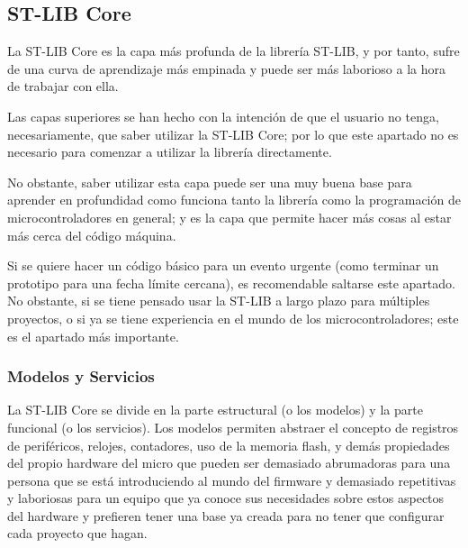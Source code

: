 \documentclass{report}
\begin{document}
\subsection{ST-LIB Core}
La ST-LIB Core es la capa más profunda de la librería ST-LIB, y por tanto, sufre de una curva de aprendizaje más empinada y puede ser más laborioso a la hora de trabajar con ella. 
\par
Las capas superiores se han hecho con la intención de que el usuario no tenga, necesariamente, que saber utilizar la ST-LIB Core; por lo que este apartado no es necesario para comenzar a utilizar la librería directamente. 
\par \vspace{0.3cm}
No obstante, saber utilizar esta capa puede ser una muy buena base para aprender en profundidad como funciona tanto la librería como la programación de microcontroladores en general; y es la capa que permite hacer más cosas al estar más cerca del código máquina. \par \vspace{0.3cm}
Si se quiere hacer un código básico para un evento urgente (como terminar un prototipo para una fecha límite cercana), es recomendable saltarse este apartado. No obstante, si se tiene pensado usar la ST-LIB a largo plazo para múltiples proyectos, o si ya se tiene experiencia en el mundo de los microcontroladores; este es el apartado más importante. 

\subsubsection{Modelos y Servicios}
La ST-LIB Core se divide en la parte estructural (o los modelos) y la parte funcional (o los servicios). Los modelos permiten abstraer el concepto de registros de periféricos, relojes, contadores, uso de la memoria flash, y demás propiedades del propio hardware del micro que pueden ser demasiado abrumadoras para una persona que se está introduciendo al mundo del firmware y demasiado repetitivas y laboriosas para un equipo que ya conoce sus necesidades sobre estos aspectos del hardware y prefieren tener una base ya creada para no tener que configurar cada proyecto que hagan. \par \vspace{0.3 cm}
\end{document}
